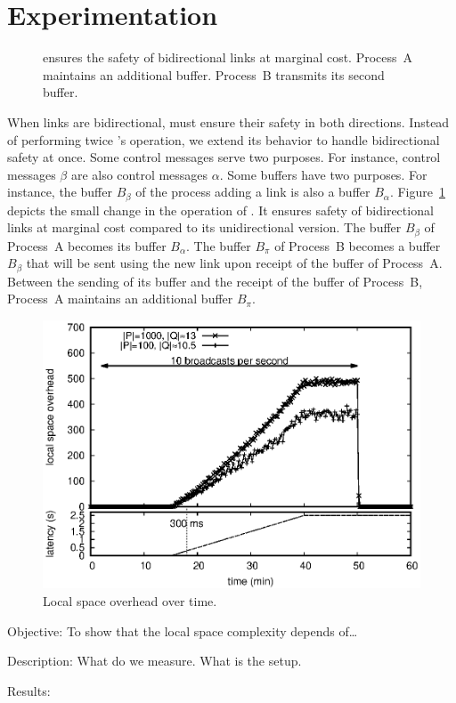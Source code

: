 
\section{Experimentation}
\label{sec:experimentation}

\begin{figure}
  \begin{center}
  
  \caption{\label{fig:bibroadcast}\RPCBROADCAST ensures the safety of bidirectional links
    at marginal cost. Process~A maintains an additional buffer. Process~B transmits its
    second buffer.}
  \end{center}
\end{figure}

When links are bidirectional, \RPCBROADCAST must ensure their safety in both
directions. Instead of performing twice \RPCBROADCAST's operation, we extend its
behavior to handle bidirectional safety at once. Some control messages serve two
purposes. For instance, control messages $\beta$ are also control messages
$\alpha$. Some buffers have two purposes. For instance, the buffer $B_\beta$ of
the process adding a link is also a buffer $B_\alpha$.
Figure~\ref{fig:bibroadcast} depicts the small change in the operation of
\RPCBROADCAST. It ensures safety of bidirectional links at marginal cost
compared to its unidirectional version. The buffer $B_\beta$ of Process~A
becomes its buffer $B_\alpha$. The buffer $B_\pi$ of Process~B becomes a buffer
$B_\beta$ that will be sent using the new link upon receipt of the buffer of
Process~A. Between the sending of its buffer and the receipt of the buffer of
Process~B, Process~A maintains an additional buffer $B_\pi$.


\begin{figure}
  \begin{center}
    \includegraphics[width=0.8\columnwidth]{./img/overhead.eps}
    \caption{\label{fig:overhead}Local space overhead over time.}
  \end{center}
\end{figure}

\begin{asparadesc}
\item[Objective:] To show that the local space complexity depends of\ldots {}
\item[Description:] What do we measure. What is the setup.
\item[Results:]
\end{asparadesc}


